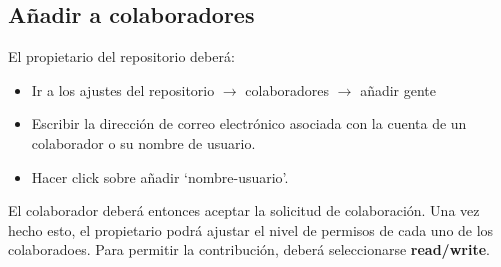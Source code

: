 \documentclass[
twoside,
12pt,                   
]{article}
\begin{document}
\subsection{Añadir a colaboradores}
El propietario del repositorio deberá:
\begin{itemize}
    \item Ir a los ajustes del repositorio $\to$ colaboradores $\to$ añadir gente
    \item Escribir la dirección de correo electrónico asociada con la cuenta de un colaborador o su nombre de usuario.
    \item Hacer click sobre añadir `nombre-usuario'.
\end{itemize}
El colaborador deberá entonces aceptar la solicitud de colaboración. Una vez hecho esto, el propietario podrá ajustar el nivel de permisos de cada uno de los colaboradoes. Para permitir la contribución, deberá seleccionarse \textbf{read/write}.
\end{document}
